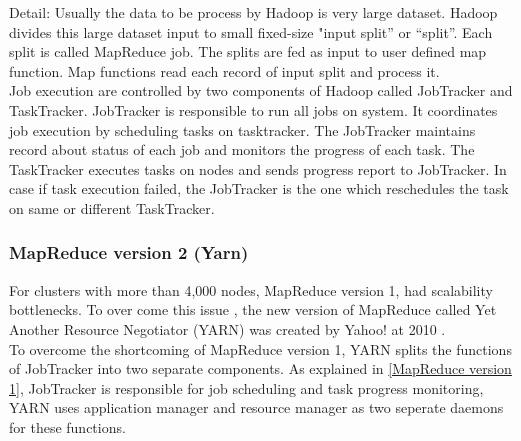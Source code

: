 Detail:
Usually the data to be process by Hadoop is very large dataset. Hadoop divides this large dataset input to small fixed-size "input split” or “split”. Each split is called MapReduce job. The splits are fed as input to user defined map function. Map functions read each record of input split and process it.\\

Job execution are controlled by two components of Hadoop called JobTracker and TaskTracker. JobTracker is responsible to run all jobs on system. It coordinates job execution by scheduling tasks on tasktracker. The JobTracker maintains record about status of each job and monitors the progress of each task. The TaskTracker executes tasks on nodes and sends progress report to JobTracker. In case if task execution failed, the JobTracker is the one which reschedules the task on same or different TaskTracker.\\




















\subsubsection{MapReduce version 2 (Yarn)}

For clusters with more than 4,000 nodes, MapReduce version 1, had scalability bottlenecks. To over come this issue , the new version of MapReduce called Yet Another Resource Negotiator (YARN) was created by Yahoo!‌ at 2010 \cite{tom3}.\\  

To overcome the shortcoming of MapReduce version 1, YARN splits the functions of JobTracker into two separate components. As explained in \ref{MapReduce version 1}‌, JobTracker is responsible for job scheduling and task progress monitoring, YARN‌ uses application manager and resource manager as two seperate daemons for these functions. \\


